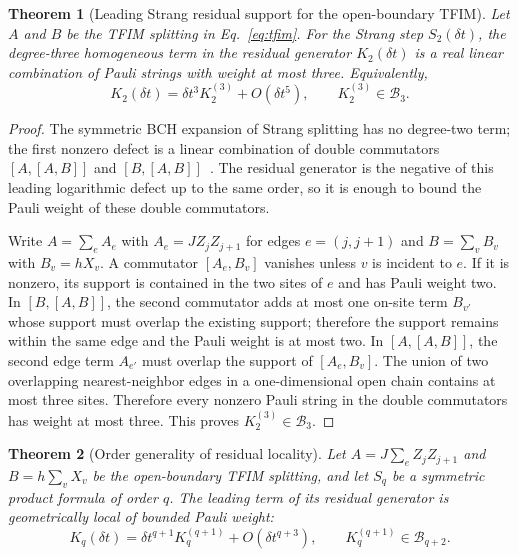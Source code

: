\documentclass[aps,prxquantum,reprint,superscriptaddress,nofootinbib,amsmath,amssymb]{revtex4-2}
\newcommand{\tfim}{TFIM}
\newcommand{\cB}{\mathcal{B}}
\newcommand{\dt}{\delta t}
\newtheorem{theorem}{Theorem}
\begin{document}
\begin{theorem}[Leading Strang residual support for the open-boundary TFIM]
\label{thm:tfim-support}
Let $A$ and $B$ be the \tfim{} splitting in Eq.~\eqref{eq:tfim}. For the Strang step $S_2(\dt)$, the degree-three homogeneous term in the residual generator $K_2(\dt)$ is a real linear combination of Pauli strings with weight at most three. Equivalently,
\begin{equation}
    K_2(\dt)=\dt^3K_2^{(3)}+O(\dt^5),
    \qquad
    K_2^{(3)}\in\cB_3.
\end{equation}
\end{theorem}

\begin{proof}
The symmetric BCH expansion of Strang splitting has no degree-two term; the first nonzero defect is a linear combination of double commutators $[A,[A,B]]$ and $[B,[A,B]]$~\cite{magnus1954,blanes2009}. The residual generator is the negative of this leading logarithmic defect up to the same order, so it is enough to bound the Pauli weight of these double commutators.

Write $A=\sum_e A_e$ with $A_e=JZ_jZ_{j+1}$ for edges $e=(j,j+1)$ and $B=\sum_v B_v$ with $B_v=hX_v$. A commutator $[A_e,B_v]$ vanishes unless $v$ is incident to $e$. If it is nonzero, its support is contained in the two sites of $e$ and has Pauli weight two. In $[B,[A,B]]$, the second commutator adds at most one on-site term $B_{v'}$ whose support must overlap the existing support; therefore the support remains within the same edge and the Pauli weight is at most two. In $[A,[A,B]]$, the second edge term $A_{e'}$ must overlap the support of $[A_e,B_v]$. The union of two overlapping nearest-neighbor edges in a one-dimensional open chain contains at most three sites. Therefore every nonzero Pauli string in the double commutators has weight at most three. This proves $K_2^{(3)}\in\cB_3$.
\end{proof}

\begin{theorem}[Order generality of residual locality]
\label{thm:order-locality}
Let $A=J\sum_e Z_jZ_{j+1}$ and $B=h\sum_v X_v$ be the open-boundary \tfim{} splitting, and let $S_q$ be a symmetric product formula of order $q$. The leading term of its residual generator is geometrically local of bounded Pauli weight:
\begin{equation}
    K_q(\dt)=\dt^{q+1}K_q^{(q+1)}+O(\dt^{q+3}),
    \qquad
    K_q^{(q+1)}\in\cB_{q+2}.
\end{equation}
\end{theorem}
\end{document}
